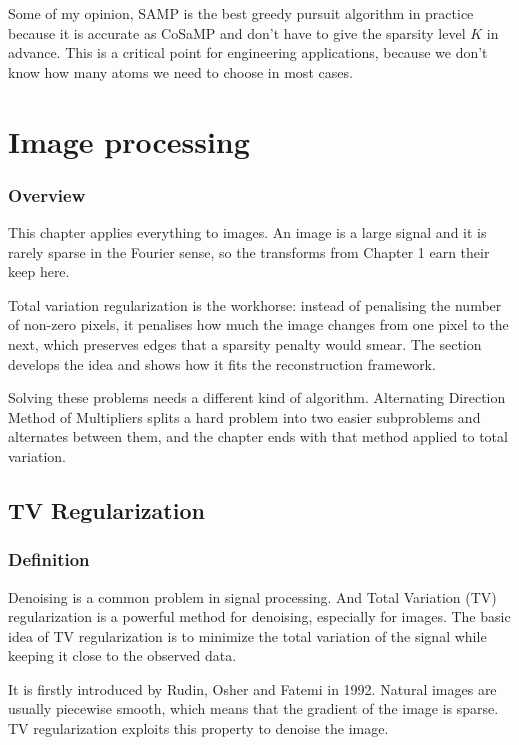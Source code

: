 \documentclass[10pt,a4paper,oneside,numbers=noenddot]{scrbook}
\theoremstyle{ctplain}
\theoremstyle{ctresult}
\begin{document}
Some of my opinion, SAMP is the best greedy pursuit algorithm in practice because it
is accurate as CoSaMP and don't have to give the sparsity level $K$ in advance. This
is a critical point for engineering applications, because we don't know how many
atoms we need to choose in most cases.

\chapter{Image processing}

\subsection*{Overview}

This chapter applies everything to images. An image is a large signal and it is rarely
sparse in the Fourier sense, so the transforms from Chapter 1 earn their keep here.

Total variation regularization is the workhorse: instead of penalising the number of
non-zero pixels, it penalises how much the image changes from one pixel to the next, which
preserves edges that a sparsity penalty would smear. The section develops the idea and
shows how it fits the reconstruction framework.

Solving these problems needs a different kind of algorithm. Alternating Direction Method of
Multipliers splits a hard problem into two easier subproblems and alternates between them,
and the chapter ends with that method applied to total variation.


\section{TV Regularization}
\subsection{Definition}

Denoising is a common problem in signal processing. And Total Variation (TV)
regularization is a powerful method for denoising, especially for images. The basic
idea of TV regularization is to minimize the total variation of the signal while
keeping it close to the observed data.

It is firstly introduced by Rudin, Osher and Fatemi in 1992. Natural images are
usually piecewise smooth, which means that the gradient of the image is sparse. TV
regularization exploits this property to denoise the image.
\end{document}
